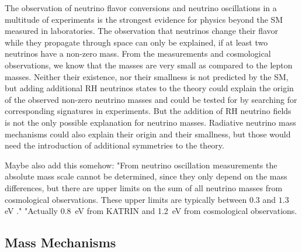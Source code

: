 The observation of neutrino flavor conversions and neutrino oscillations in a multitude of experiments is the strongest evidence for physics beyond the SM measured in laboratories. The observation that neutrinos change their flavor while they propagate through space can only be explained, if at least two neutrinos have a non-zero mass. From the measurements and cosmological observations, we know that the masses are very small as compared to the lepton masses. Neither their existence, nor their smallness is not predicted by the SM, but adding additional RH neutrinos states to the theory could explain the origin of the observed non-zero neutrino masses and could be tested for by searching for corresponding signatures in experiments. But the addition of RH neutrino fields is not the only possible explanation for neutrino masses. Radiative neutrino mass mechanisms could also explain their origin and their smallness, but those would need the introduction of additional symmetries to the theory.


Maybe also add this somehow: "From neutrino oscillation measurements the absolute mass scale cannot be determined, since they only depend on the mass differences, but there are upper limits on the sum of all neutrino masses from cosmological observations.
These upper limits are typically between $0.3$ and $1.3$\,eV ."
"Actually \SI{0.8}{\electronvolt}  from KATRIN and \SI{1.2}{\electronvolt}  from cosmological observations. 


\subsection{Mass Mechanisms}


